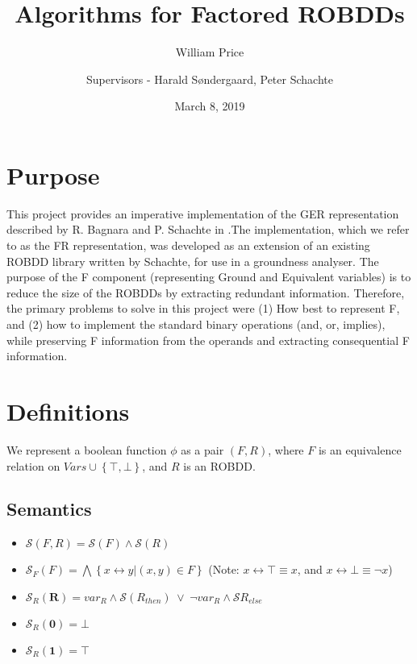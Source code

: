 \documentclass[11pt,table]{article}
\title{Algorithms for Factored ROBDDs}
\author{William Price \quad 917093}
\author{Supervisors - Harald S{\o}ndergaard, Peter Schachte}
\date{March 8, 2019}                                           %
\newcounter{r}
\newcommand{\biim}{\leftrightarrow}
\begin{document}
\maketitle


\section{Purpose}

This project provides an imperative implementation of the GER representation described by R. Bagnara and P. Schachte in \cite{bag_schachteGER}.The implementation, which we refer to as the FR representation, was developed as an extension of an existing ROBDD library written by Schachte, for use in a groundness analyser. The purpose of the F component (representing Ground and Equivalent variables) is to reduce the size of the ROBDDs by extracting redundant information. Therefore, the primary problems to solve in this project were (1) How best to represent F, and (2) how to implement the standard binary operations (and, or, implies), while preserving F information from the operands and extracting consequential F information.




\section{Definitions}
We represent a boolean function $\phi$ as a pair $ (F,R) $, where $ F $ is an equivalence relation on $ Vars \cup \left\lbrace \top, \bot \right\rbrace  $, and $ R $ is an ROBDD.

\subsection{Semantics}
\begin{itemize}
	\item $ \mathcal{S}(F,R) =  \mathcal{S}(F) \wedge  \mathcal{S}(R) $
	
	\item $\mathcal{S}_F(F) = \bigwedge \left\lbrace x \biim y | (x,y)\in F\right\rbrace $ \hspace{1in} (Note: $ x \biim \top \equiv x $, and $ x \biim \bot \equiv \neg x $)
	
	\item  $ \mathcal{S}_R(\textbf{R}) = var_R \wedge \mathcal{S}(R_{then}) \hspace{3pt} \vee \hspace{3pt} \neg var_R \wedge \mathcal{S}R_{else}$
	
	\item $ \mathcal{S}_R(\textbf{0}) = \bot $
	
	\item $ \mathcal{S}_R(\textbf{1}) = \top $
\end{itemize}
\end{document}
